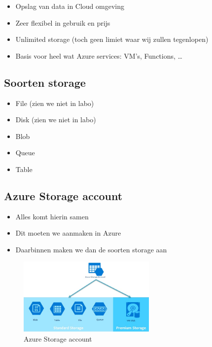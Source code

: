\documentclass{article}
\begin{document}
\begin{itemize}
    \item Opslag van data in Cloud omgeving
    \item Zeer flexibel in gebruik en prijs
    \item Unlimited storage (toch geen limiet waar wij zullen tegenlopen)
    \item Basis voor heel wat Azure services: VM's, Functions, \dots
\end{itemize}

\subsection{Soorten storage}

\begin{itemize}
    \item File (zien we niet in labo)
    \item Disk (zien we niet in labo)
    \item Blob
    \item Queue
    \item Table
\end{itemize}

\subsection{Azure Storage account}

\begin{itemize}
    \item Alles komt hierin samen
    \item Dit moeten we aanmaken in Azure
    \item Daarbinnen maken we dan de soorten storage aan
\end{itemize}

\begin{figure}[H]
    \centering
    \includegraphics[width=0.6\textwidth]{azure-storage-account.png}
    \caption{Azure Storage account}
\end{figure}
\end{document}
